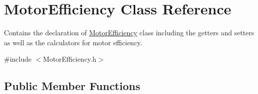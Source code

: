 \hypertarget{class_motor_efficiency}{}\section{Motor\+Efficiency Class Reference}
\label{class_motor_efficiency}


Contains the declaration of \hyperlink{class_motor_efficiency}{Motor\+Efficiency} class including the getters and setters as well as the calculators for motor efficiency.  




{\ttfamily \#include $<$Motor\+Efficiency.\+h$>$}

\subsection*{Public Member Functions}
